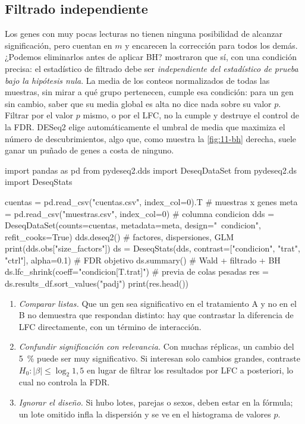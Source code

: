 \subsection{Filtrado independiente}

Los genes con muy pocas lecturas no tienen ninguna posibilidad de alcanzar significación, pero cuentan en $m$ y encarecen la corrección para todos los demás. ¿Podemos eliminarlos antes de aplicar BH? \textcite{c11-bourgon2010} mostraron que sí, con una condición precisa: el estadístico de filtrado debe ser \emph{independiente del estadístico de prueba bajo la hipótesis nula}. La media de los conteos normalizados de todas las muestras, sin mirar a qué grupo pertenecen, cumple esa condición: para un gen sin cambio, saber que su media global es alta no dice nada sobre su valor $p$. Filtrar por el valor $p$ mismo, o por el LFC, no la cumple y destruye el control de la FDR. DESeq2 elige automáticamente el umbral de media que maximiza el número de descubrimientos, algo que, como muestra la \cref{fig:11-bh} derecha, suele ganar un puñado de genes a costa de ninguno.

\begin{codigo}
import pandas as pd
from pydeseq2.dds import DeseqDataSet
from pydeseq2.ds import DeseqStats

cuentas = pd.read_csv("cuentas.csv", index_col=0).T   # muestras x genes
meta = pd.read_csv("muestras.csv", index_col=0)    # columna condicion
dds = DeseqDataSet(counts=cuentas, metadata=meta,
                   design="~condicion", refit_cooks=True)
dds.deseq2()                        # factores, dispersiones, GLM
print(dds.obs["size_factors"])
ds = DeseqStats(dds, contrast=["condicion", "trat", "ctrl"],
                alpha=0.1)          # FDR objetivo
ds.summary()                        # Wald + filtrado + BH
ds.lfc_shrink(coeff="condicion[T.trat]")   # previa de colas pesadas
res = ds.results_df.sort_values("padj")
print(res.head())
\end{codigo}

\begin{cuidado}
\begin{enumerate}
  \item \emph{Comparar listas.} Que un gen sea significativo en el tratamiento A y no en el B no demuestra que respondan distinto: hay que contrastar la diferencia de LFC directamente, con un término de interacción.
  \item \emph{Confundir significación con relevancia.} Con muchas réplicas, un cambio del \SI{5}{\percent} puede ser muy significativo. Si interesan solo cambios grandes, contraste $H_0:|\beta|\le\log_2 1{,}5$ en lugar de filtrar los resultados por LFC a posteriori, lo cual no controla la FDR.
  \item \emph{Ignorar el diseño.} Si hubo lotes, parejas o sexos, deben estar en la fórmula; un lote omitido infla la dispersión y se ve en el histograma de valores $p$.
\end{enumerate}
\end{cuidado}

